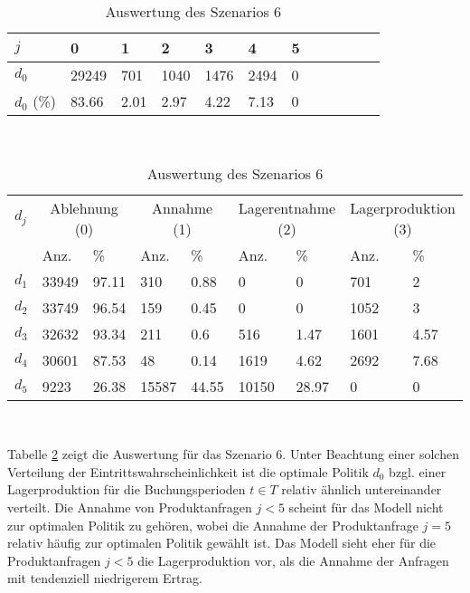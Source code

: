 \begin{table}[h!]
\renewcommand{\arraystretch}{1.5}
  \begin{center}
    \caption{Auswertung des Szenarios 6}  \label{AS6}
    \vspace*{3mm}
    \begin{tabular}{l l l l l l l l l l l l }  \hline 
         $j$ & 0 & 1  & 2 & 3 & 4  & 5   \\  \hline
$d_{0}$ &  29249 &   701 &  1040 &  1476 &  2494 &  0 \\
$d_{0}$ (\%) &  83.66 &  2.01 &  2.97 &  4.22 &  7.13 &  0 \\
\hline
    \end{tabular} \\[3mm]
        \begin{tabular}{ l l l l l l l l l}   \hline    %
    $d_j$ & \multicolumn{2}{c}{Ablehnung (0)} & \multicolumn{2}{c}{Annahme (1)}  & \multicolumn{2}{c}{Lagerentnahme (2)} & \multicolumn{2}{c}{Lagerproduktion (3)}\\
    & Anz. & \% & Anz. & \% & Anz. & \% & Anz. & \% \\ \hline 
$d_{1}$ &  33949 &  97.11 &    310 &   0.88 &    0 &    0 &   701 &     2 \\
$d_{2}$ &  33749 &  96.54 &    159 &   0.45 &    0 &    0 &  1052 &     3 \\ 
$d_{3}$ &  32632 &  93.34 &    211 &    0.6 &    516 &   1.47 &  1601 &  4.57 \\
$d_{4}$ &  30601 &  87.53 &     48 &   0.14 &   1619 &   4.62 &  2692 &  7.68 \\
$d_{5}$ &   9223 &  26.38 &  15587 &  44.55 &  10150 &  28.97 &   0 &   0 \\
          \hline
   \end{tabular} \\[3mm]
     \end{center}
\end{table}

Tabelle \ref{AS6} zeigt die Auswertung für das Szenario 6. Unter Beachtung einer solchen Verteilung der Eintrittswahrscheinlichkeit ist die optimale Politik $d_0$ bzgl. einer Lagerproduktion für die Buchungsperioden $t\in T$ relativ ähnlich untereinander verteilt. Die Annahme von Produktanfragen $j<5$ scheint für das Modell nicht zur optimalen Politik zu gehören, wobei die Annahme der Produktanfrage $j=5$ relativ häufig zur optimalen Politik gewählt ist. Das Modell sieht eher für die Produktanfragen $j<5$ die Lagerproduktion vor, als die Annahme der Anfragen mit tendenziell niedrigerem Ertrag. %

